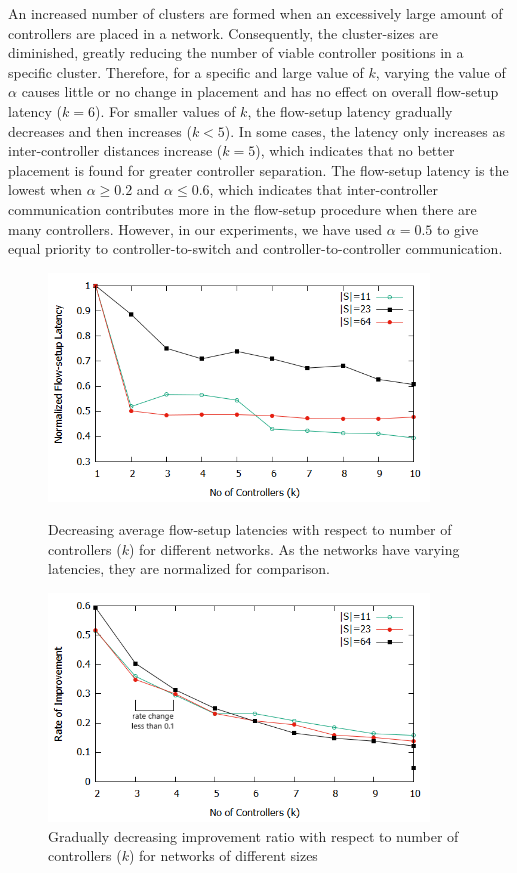\documentclass[preprint,12pt]{elsarticle}
\begin{document}
	An increased number of clusters are formed when an excessively large amount of controllers are placed in a network. Consequently, the cluster-sizes are diminished, greatly reducing the number of viable controller positions in a specific cluster. Therefore, for a specific and large value of $k$, varying the value of $\alpha$ causes little or no change in placement and has no effect on overall flow-setup latency ($k=6$). For smaller values of $k$, the flow-setup latency gradually decreases and then increases ($k<5$). In some cases, the latency only increases as inter-controller distances increase ($k=5$), which indicates that no better placement is found for greater controller separation. The flow-setup latency is the lowest when $\alpha \ge 0.2$ and $\alpha \le 0.6$, which indicates that inter-controller communication contributes more in the flow-setup procedure when there are many controllers. However, in our experiments, we have used $\alpha=0.5$ to give equal priority to controller-to-switch and controller-to-controller communication.
	
	\begin{figure}
		\centering
		\includegraphics[width=0.9\textwidth]{Images/k_vs_l.png}
		\caption{Decreasing average flow-setup latencies with respect to number of controllers ($k$) for different networks. As the networks have varying latencies, they are normalized for comparison.} \label{fig:KvsL}
		\vspace{1cm}
		\centering
		\includegraphics[width=0.9\textwidth]{Images/cutoff.png}
		\caption{Gradually decreasing improvement ratio with respect to number of controllers ($k$) for networks of different sizes} \label{fig:cutoff}
	\end{figure}
\end{document}
